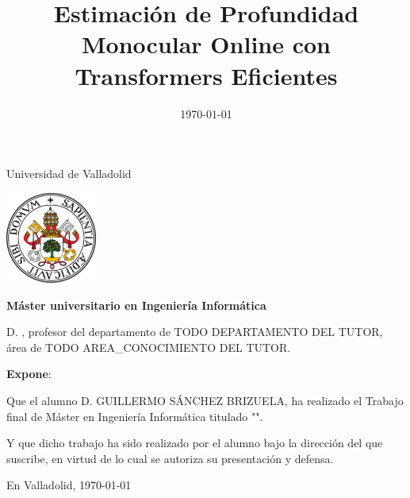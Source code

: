 \documentclass[a4paper,11pt,oneside]{memoir}
\title{Estimación de Profundidad Monocular Online con Transformers Eficientes}
\author{\nombre}
\date{\today}
\newcommand{\nombre}[0]{GUILLERMO SÁNCHEZ BRIZUELA} %
\newcommand{\depto}[0]{TODO DEPARTAMENTO DEL TUTOR}
\newcommand{\areac}[0]{TODO AREA\_CONOCIMIENTO DEL TUTOR}
\begin{document}
\maketitle



\newpage\null\thispagestyle{empty}\newpage


\thispagestyle{empty}


\noindent
\begin{center}%
	{\noindent\Huge Universidad de Valladolid}\vspace{.5cm}%
	
\begin{center}%
	\includegraphics[height=3cm]{imagenes/escudoUVA} \hspace{1cm}
\end{center}%

	{\noindent\Large \textbf{Máster universitario en Ingeniería Informática}}\vspace{.5cm}%
\end{center}%



\noindent D. \makeatletter\@tutor\makeatother, profesor del departamento de \depto, área de \areac.

\noindent \textbf{Expone}:

\noindent Que el alumno D. \nombre, %
ha realizado el Trabajo final de Máster en Ingeniería Informática titulado "\makeatletter\textsc{\@title{}}\makeatother". 

\noindent Y que dicho trabajo ha sido realizado por el alumno bajo la dirección del que suscribe, en virtud de lo cual se autoriza su presentación y defensa.

\begin{center} %
En Valladolid, {\large \today}
\end{center}

\vfill\vfill\vfill

%
\end{document}
